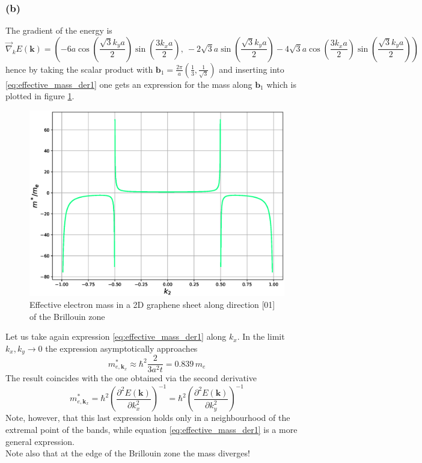 \documentclass{article}
\newcommand{\ve}[1]{\mathbf{#1}}
\begin{document}
\subsubsection*{(b)}
The gradient of the energy is 
\begin{equation*}
    \vec \nabla_k E(\ve k) = \left(
        -6a\cos\left(\frac{\sqrt{3}k_ya}{2}\right)
        \sin\left(\frac{3k_xa}{2}\right), \ 
        -2\sqrt{3}a\sin\left(\frac{\sqrt{3}k_ya}{2}\right) 
        -4\sqrt{3}a\cos\left(\frac{3k_xa}{2}\right) 
        \sin\left(\frac{\sqrt{3}k_ya}{2}\right) 
    \right)
\end{equation*}
hence by taking the scalar product with $\ve b_1 = \frac{2\pi}{a}(\frac{1}{3}, \frac{1}{\sqrt{3}})$ and inserting into \ref{eq:effective_mass_der1} one gets an expression for the mass along 
$\ve b_1$ which is plotted in figure \ref{fig:m_eff}.
\begin{figure}
    \centering 
    \includegraphics[scale=0.5]{meff.eps}
    \caption{Effective electron mass in a 2D graphene sheet along direction [01] of the Brillouin zone}
    \label{fig:m_eff}
\end{figure}
Let us take again expression \ref{eq:effective_mass_der1} along $k_x$. In the limit $k_x,k_y \to 0$ the expression asymptotically approaches
\begin{equation*}
    m_{e, \ve k_x}^* \approx \hbar^2 \frac{2}{3a^2t} = 0.839 \, m_e
\end{equation*}
The result coincides with the one obtained via the second derivative
\begin{equation*}
    m_{e, \ve k_x}^* = \hbar^2\left(\frac{\partial^2 E(\ve k)}{\partial k_x^2}\right)^{-1} = \hbar^2\left(\frac{\partial^2 E(\ve k)}{\partial k_y^2}\right)^{-1}
\end{equation*}
Note, however, that this last expression holds only in a neighbourhood of the extremal point of the bands, while equation \ref{eq:effective_mass_der1} is a more general expression. \\
Note also that at the edge of the Brillouin zone the mass diverges!
\end{document}
